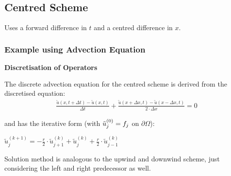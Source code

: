 \subsection{Centred Scheme}

Uses a forward difference in $t$ and a centred difference in $x$.

\subsubsection{Example using Advection Equation}


\textbf{Discretisation of Operators}

The discrete advection equation for the centred scheme is derived from the discretised equation:
\begin{align*}
	{\frac{\tilde{u}(x,t+\Delta t)-\tilde{u}(x,t)}{\Delta t}}+{\frac{\tilde{u}(x+\Delta x,t)-\tilde{u}(x-\Delta x,t)}{2\cdot\Delta x}}=0
\end{align*}

and has the iterative form (with $\tilde{u}_j^{(0)}=f_j$ on $\partial\Omega$):

\colorbox{shadecolor}{$
	\tilde{u}_{j}^{(k+1)}=-\frac{r}{2}\cdot\tilde{u}_{j+1}^{(k)}+\tilde{u}_{j}^{(k)}+\frac{r}{2}\cdot\tilde{u}_{j-1}^{(k)}
$}

Solution method is analogous to the upwind and downwind scheme,
just considering the left and right predecessor as well.